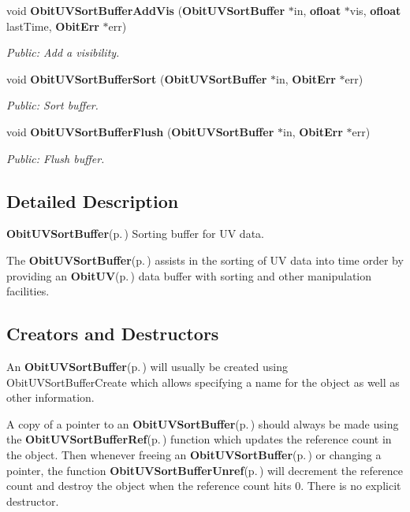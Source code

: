\begin{CompactItemize}
void {\bf Obit\-UVSort\-Buffer\-Add\-Vis} ({\bf Obit\-UVSort\-Buffer} $\ast$in, {\bf ofloat} $\ast$vis, {\bf ofloat} last\-Time, {\bf Obit\-Err} $\ast$err)
\begin{CompactList}\small\item\em Public: Add a visibility. \item\end{CompactList}\item 
void {\bf Obit\-UVSort\-Buffer\-Sort} ({\bf Obit\-UVSort\-Buffer} $\ast$in, {\bf Obit\-Err} $\ast$err)
\begin{CompactList}\small\item\em Public: Sort buffer. \item\end{CompactList}\item 
void {\bf Obit\-UVSort\-Buffer\-Flush} ({\bf Obit\-UVSort\-Buffer} $\ast$in, {\bf Obit\-Err} $\ast$err)
\begin{CompactList}\small\item\em Public: Flush buffer. \item\end{CompactList}\end{CompactItemize}


\subsection{Detailed Description}
{\bf Obit\-UVSort\-Buffer}{\rm (p.\,\pageref{structObitUVSortBuffer})} Sorting buffer for UV data. 

The {\bf Obit\-UVSort\-Buffer}{\rm (p.\,\pageref{structObitUVSortBuffer})} assists in the sorting of UV data into time order by providing an {\bf Obit\-UV}{\rm (p.\,\pageref{structObitUV})} data buffer with sorting and other manipulation facilities.\subsection{Creators and Destructors}\label{ObitUVSortBuffer_8h_ObitUVSortBufferaccess}
An {\bf Obit\-UVSort\-Buffer}{\rm (p.\,\pageref{structObitUVSortBuffer})} will usually be created using Obit\-UVSort\-Buffer\-Create which allows specifying a name for the object as well as other information.

A copy of a pointer to an {\bf Obit\-UVSort\-Buffer}{\rm (p.\,\pageref{structObitUVSortBuffer})} should always be made using the {\bf Obit\-UVSort\-Buffer\-Ref}{\rm (p.\,\pageref{ObitUVSortBuffer_8h_a1})} function which updates the reference count in the object. Then whenever freeing an {\bf Obit\-UVSort\-Buffer}{\rm (p.\,\pageref{structObitUVSortBuffer})} or changing a pointer, the function {\bf Obit\-UVSort\-Buffer\-Unref}{\rm (p.\,\pageref{ObitUVSortBuffer_8h_a0})} will decrement the reference count and destroy the object when the reference count hits 0. There is no explicit destructor.

